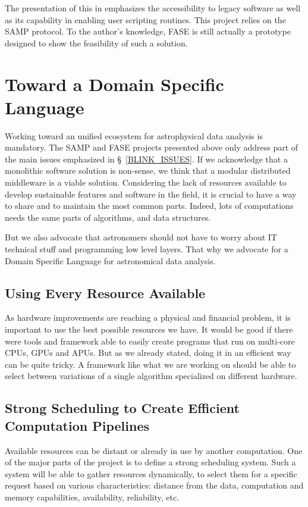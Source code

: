 			The presentation of this in \citet{Grosbol} emphasizes the accessibility to legacy software as well as its capability in enabling user scripting routines. This project relies on the SAMP protocol. To the author's knowledge, FASE is still actually a prototype designed to show the feasibility of such a solution.

	\section{Toward a Domain Specific Language}
		Working toward an unified ecosystem for astrophysical data analysis is mandatory. The SAMP and FASE projects presented above only address part of the main issues emphasized in \S~\ref{BLINK_ISSUES}. If we acknowledge that a monolithic software solution is non-sense, we think that a modular distributed middleware is a viable solution. Considering the lack of resources available to develop sustainable features and software in the field, it is crucial to have a way to share and to maintain the most common parts. Indeed, lots of computations needs the same parts of algorithms, and data structures.
		
		But we also advocate that astronomers should not have to worry about IT technical stuff and programming low level layers. That why we advocate for a Domain Specific Language for astronomical data analysis.

		\subsection{Using Every Resource Available}
			As hardware improvements are reaching a physical and financial problem, it is important to use the best possible resources we have. It would be good if there were tools and framework able to easily create programs that run on multi-core CPUs, GPUs and APUs. But as we already stated, doing it in an efficient way can be quite tricky. A framework like what we are working on should be able to select between variations of a single algorithm specialized on different hardware.

		\subsection{Strong Scheduling to Create Efficient Computation Pipelines}
			Available resources can be distant or already in use by another computation. One of the major parts of the project is to define a strong scheduling system. Such a system will be able to gather resources dynamically, to select them for a specific request based on various characteristics: distance from the data, computation and memory capabilities, availability, reliability, etc.
			
